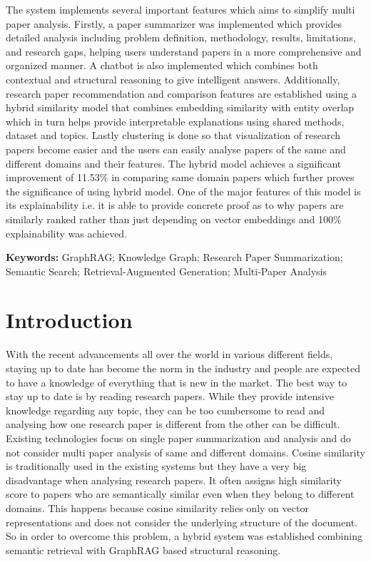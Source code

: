 \documentclass[10pt]{article}
\begin{document}
The system implements several important features which aims to simplify multi paper analysis. Firstly, a paper summarizer was implemented which provides detailed analysis including problem definition, methodology, results, limitations, and research gaps, helping users understand papers in a more comprehensive and organized manner. A chatbot is also implemented which combines both contextual and structural reasoning to give intelligent answers. Additionally, research paper recommendation and comparison features are established using a hybrid similarity model that combines embedding similarity with entity overlap which in turn helps provide interpretable explanations using shared methods, dataset and topics. Lastly clustering is done so that visualization of research papers become easier and the users can easily analyse papers of the same and different domains and their features. The hybrid model achieves a significant improvement of 11.53\% in comparing same domain papers which further proves the significance of using hybrid model. One of the major features of this model is its explainability i.e. it is able to provide concrete proof as to why papers are similarly ranked rather than just depending on vector embeddings and 100\% explainability was achieved.

\textbf{Keywords:} GraphRAG; Knowledge Graph; Research Paper Summarization; Semantic Search; Retrieval-Augmented Generation; Multi-Paper Analysis

\section{Introduction}
With the recent advancements all over the world in various different fields, staying up to date has become the norm in the industry and people are expected to have a knowledge of everything that is new in the market. The best way to stay up to date is by reading research papers. While they provide intensive knowledge regarding any topic, they can be too cumbersome to read and analysing how one research paper is different from the other can be difficult. Existing technologies focus on single paper summarization and analysis and do not consider multi paper analysis of same and different domains. Cosine similarity is traditionally used in the existing systems but they have a very big disadvantage when analysing research papers. It often assigns high similarity score to papers who are semantically similar even when they belong to different domains. This happens because cosine similarity relies only on vector representations and does not consider the underlying structure of the document. So in order to overcome this problem, a hybrid system was established combining semantic retrieval with GraphRAG based structural reasoning.
\end{document}
